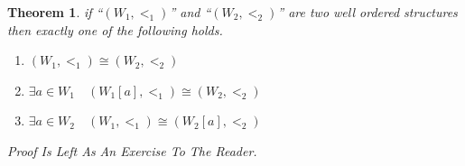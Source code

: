 \documentclass[10pt,a4paper]{book}
\newtheorem{theorem}{Theorem}[section]
\begin{document}
\begin{theorem}  if  ``$(W_1 , <_1)$'' and ``$(W_2 , <_2)$''  are two  well ordered  structures then exactly one of the following holds.\\
    \begin{enumerate}
        \setlength{\itemsep}{0pt} %
        \item       $(W_1 , <_1) \cong (W_2 , <_2) $
        \item       $\exists a \in W_1 \quad  (W_1[a] , <_1) \cong (W_2 , <_2) $
        \item       $\exists a \in W_2 \quad  (W_1 , <_1) \cong (W_2[a] , <_2) $
    \end{enumerate}
    Proof Is Left As An Exercise To The Reader.
\end{theorem}
\end{document}

